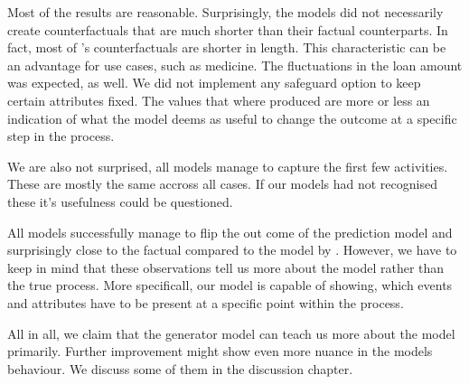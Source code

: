 \documentclass[./../../paper.tex]{subfiles}
\begin{document}
Most of the results are reasonable. Surprisingly, the models did not necessarily create counterfactuals that are much shorter than their factual counterparts. In fact, most of \citeauthor{hsieh_DiCE4ELInterpretingProcess_2021}'s counterfactuals are shorter in length.  This characteristic can be an advantage for use cases, such as medicine. The fluctuations in the loan amount was expected, as well. We did not implement any safeguard option to keep certain attributes fixed. The values that where produced are more or less an indication of what the model deems as useful to change the outcome at a specific step in the process. 

We are also not surprised, all models manage to capture the first few activities. These are mostly the same accross all cases. If our models had not recognised these it's usefulness could be questioned. 

All models successfully manage to flip the out come of the prediction model and surprisingly close to the factual compared to the model by \citeauthor{hsieh_DiCE4ELInterpretingProcess_2021}. However, we have to keep in mind that these observations tell us more about the model rather than the true process. More specificall, our model is capable of showing, which events and attributes have to be present at a specific point within the process. 
   

All in all, we claim that the generator model can teach us more about the model primarily. Further improvement might show even more nuance in the models behaviour. We discuss some of them in the discussion chapter.
\end{document}
